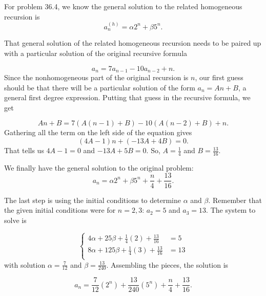 \begin{Solution}{37.2}

For problem 36.4, we know the general solution to the related homogeneous recursion is
\[
a_n^{(h)} = \alpha2^n +\beta5^n.
\]

That general solution  of the related homogeneous recursion needs to be paired up with a particular solution of the original 
recursive formula

\[
a_n = 7a_{n-1} - 10a_{n-2}+n.
\]
Since the nonhomogeneous part of the original recursion is  $n$, our first guess should be that there
will be a particular solution of the form $a_n = An+B$,  a general first degree expression. Putting that guess in the recursive formula, we get

\[
An + B = 7(A(n-1)+ B) - 10(A(n-2) + B) + n.
\]
Gathering all the term on the left side of the equation gives
\[
(4A-1)n + (-13A+4B) = 0.
\]
That tells us $4A-1 = 0$ and $-13A+5B = 0$. So, $A=\frac{1}{4}$ and $B= \frac{13}{16}$.

We finally have the general solution to the original problem:
\[
a_n =  \alpha2^n +\beta5^n + \frac{n}{4} +\frac{13}{16}.
\]

The last step is using the initial conditions to determine $\alpha$ and $\beta$. Remember that the given initial conditions were for $n = 2,3$: $a_2 = 5$ and $a_3 = 13$. The system to solve is

\[
  \left\{
    \begin{aligned}
     4\alpha + 25\beta  +\frac{1}{4}(2) + \frac{13}{16} &= 5\\
     8\alpha + 125\beta +\frac{1}{4}(3) + \frac{13}{16} &= 13\\
     \end{aligned}
   \right.
\]
with solution $\alpha = \frac{7}{12}$ and $\beta = \frac{13}{240}$.  Assembling the pieces,  the solution is

\[
a_n = \frac{7}{12}(2^n) + \frac{13}{240}(5^n) + \frac{n}{4} +\frac{13}{16}.
\]

\end{Solution}

